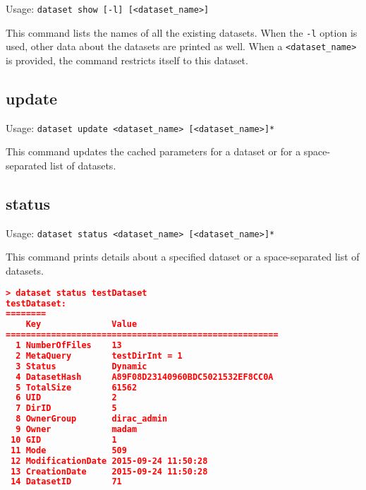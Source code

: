 Usage: \texttt{dataset show [-l] [<dataset\_name>]}

This command lists the names of all the existing datasets. When the \texttt{-l}
option is used, other data about the datasets are printed as well.
When a \texttt{<dataset\_name>} is provided, the command restricts
itself to this dataset.

\subsection{update}

Usage: \texttt{dataset update <dataset\_name> [<dataset\_name>]*}

This command updates the cached parameters for a dataset or for a space-separated 
list of datasets.

\pagebreak

\subsection{status}

Usage: \texttt{dataset status <dataset\_name> [<dataset\_name>]*}

This command prints details about a specified dataset or a space-separated list of
datasets.

\begin{lstlisting}[language=json]
> dataset status testDataset
testDataset:
========
    Key              Value
======================================================
  1 NumberOfFiles    13
  2 MetaQuery        testDirInt = 1
  3 Status           Dynamic
  4 DatasetHash      A89F08D23140960BDC5021532EF8CC0A
  5 TotalSize        61562
  6 UID              2
  7 DirID            5
  8 OwnerGroup       dirac_admin
  9 Owner            madam
 10 GID              1
 11 Mode             509
 12 ModificationDate 2015-09-24 11:50:28
 13 CreationDate     2015-09-24 11:50:28
 14 DatasetID        71
\end{lstlisting}

